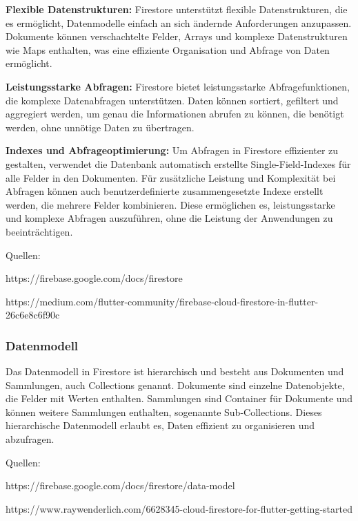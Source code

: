 \textbf{Flexible Datenstrukturen:} Firestore unterstützt flexible Datenstrukturen, die es ermöglicht, Datenmodelle einfach an sich ändernde Anforderungen anzupassen. Dokumente können verschachtelte Felder, Arrays und komplexe Datenstrukturen wie Maps enthalten, was eine effiziente Organisation und Abfrage von Daten ermöglicht.

\textbf{Leistungsstarke Abfragen:} Firestore bietet leistungsstarke Abfragefunktionen, die komplexe Datenabfragen unterstützen.
Daten können sortiert, gefiltert und aggregiert werden, um genau die Informationen abrufen zu können, die benötigt werden, ohne unnötige Daten zu übertragen.

\textbf{Indexes und Abfrageoptimierung:} Um Abfragen in Firestore effizienter zu gestalten, verwendet die Datenbank automatisch erstellte Single-Field-Indexes für alle Felder in den Dokumenten. Für zusätzliche Leistung und Komplexität bei Abfragen können auch benutzerdefinierte zusammengesetzte Indexe erstellt werden, die mehrere Felder kombinieren. Diese ermöglichen es, leistungsstarke und komplexe Abfragen auszuführen, ohne die Leistung der Anwendungen zu beeinträchtigen.





Quellen:

https://firebase.google.com/docs/firestore

https://medium.com/flutter-community/firebase-cloud-firestore-in-flutter-26c6e8c6f90c



\subsubsection{Datenmodell}

Das Datenmodell in Firestore ist hierarchisch und besteht aus Dokumenten und Sammlungen, auch Collections genannt. Dokumente sind einzelne Datenobjekte, die Felder mit Werten enthalten. Sammlungen sind Container für Dokumente und können weitere Sammlungen enthalten, sogenannte Sub-Collections. Dieses hierarchische Datenmodell erlaubt es, Daten effizient zu organisieren und abzufragen.

Quellen:

https://firebase.google.com/docs/firestore/data-model

https://www.raywenderlich.com/6628345-cloud-firestore-for-flutter-getting-started


